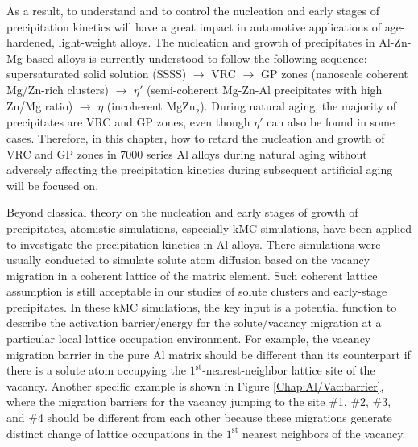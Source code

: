 As a result, to understand and to control the nucleation and early stages of precipitation kinetics will have a great impact in automotive applications of age-hardened, light-weight alloys\cite{deschamps1998influence,banhart2011kinetics,liang2012kinetics,deschamps2014precipitation}. The nucleation and growth of precipitates in Al-Zn-Mg-based alloys is currently understood to follow the following sequence: supersaturated solid solution (SSSS) $\rightarrow$ \acf{VRC} $\rightarrow$ \acf{GP} zones (nanoscale coherent Mg/Zn-rich clusters) $\rightarrow$ $\eta'$ (semi-coherent Mg-Zn-Al precipitates with high Zn/Mg ratio) $\rightarrow$ $\eta$ (incoherent $\text{MgZn}_\text{2}$)\cite{ragueneau2000review,deschamps2014precipitation,berg2001gp,chung2018transmission}. During natural aging, the majority of precipitates are \ac{VRC} and \ac{GP} zones, even though $\eta'$ can also be found in some cases\cite{mukhopadhyay1994guinier}. Therefore, in this chapter, how to retard the nucleation and growth of \ac{VRC} and \ac{GP} zones in 7000 series Al alloys during natural aging without adversely affecting the precipitation kinetics during subsequent artificial aging will be focused on. 

Beyond classical theory on the nucleation and early stages of growth of precipitates, atomistic simulations, especially \acf{kMC} simulations, have been applied to investigate the precipitation kinetics in Al alloys\cite{clouet2006kinetic,soisson2010atomistic,soisson1996monte,liang2012kinetics,sha2005kinetic,clouet2004nucleation,vincent2008precipitation,hirosawa1998comparison,sanchez1984generalized}. There simulations were usually conducted to simulate solute atom diffusion based on the vacancy migration in a coherent lattice of the matrix element. Such coherent lattice assumption is still acceptable in our studies of solute clusters and early-stage precipitates. In these \ac{kMC} simulations, the key input is a potential function to describe the activation barrier/energy for the solute/vacancy migration at a particular local lattice occupation environment. For example, the vacancy migration barrier in the pure Al matrix should be different than its counterpart if there is a solute atom occupying the $1^\text{st}$-nearest-neighbor lattice site of the vacancy. Another specific example is shown in Figure \ref{Chap:Al/Vac:barrier}, where the migration barriers for the vacancy jumping to the site \#1, \#2, \#3, and \#4 should be different from each other because these migrations generate distinct change of lattice occupations in the $1^\text{st}$ nearest neighbors of the vacancy.

